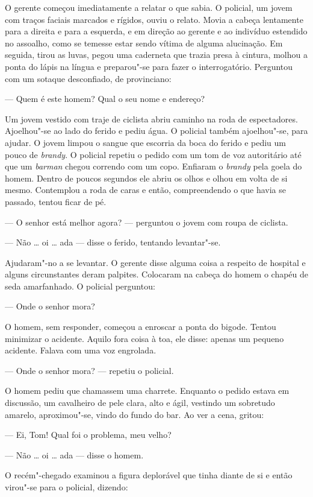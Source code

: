 O gerente começou imediatamente a relatar o que sabia.  O policial, um jovem
com traços faciais marcados e rígidos, ouviu o relato.  Movia a cabeça
lentamente para a direita e para a esquerda, e em direção ao gerente e ao
indivíduo estendido no assoalho, como se temesse estar sendo vítima de alguma
alucinação.  Em seguida, tirou as luvas, pegou uma caderneta que trazia presa à
cintura, molhou a ponta do lápis na língua e preparou"-se para fazer o
interrogatório.  Perguntou com um sotaque desconfiado, de provinciano:

--- Quem é este homem?  Qual o seu nome e endereço?

Um jovem vestido com traje de ciclista abriu caminho na roda de espectadores.
Ajoelhou"-se ao lado do ferido e pediu água.  O policial também ajoelhou"-se,
para ajudar.  O jovem limpou o sangue que escorria da boca do ferido e pediu um
pouco de \textit{brandy}.  O policial repetiu o pedido com um tom de voz
autoritário até que um \textit{barman} chegou correndo com um copo.  Enfiaram o
\textit{brandy} pela goela do homem.  Dentro de poucos segundos ele abriu os
olhos e olhou em volta de si mesmo.  Contemplou a roda de caras e então,
compreendendo o que havia se passado, tentou ficar de pé.

--- O senhor está melhor agora? --- perguntou o jovem com roupa de ciclista.

--- Não \ldots{} oi \ldots{} ada --- disse o ferido, tentando levantar"-se.

Ajudaram"-no a se levantar.  O gerente disse alguma coisa a respeito de hospital
e alguns circunstantes deram palpites.  Colocaram na cabeça do homem o chapéu
de seda amarfanhado.  O policial perguntou:

--- Onde o senhor mora?

O homem, sem responder, começou a enroscar a ponta do bigode.  Tentou minimizar
o acidente.  Aquilo fora coisa à toa, ele disse: apenas um pequeno acidente.
Falava com uma voz engrolada.

--- Onde o senhor mora? --- repetiu o policial.

O homem pediu que chamassem uma charrete.  Enquanto o pedido estava em
discussão, um cavalheiro de pele clara, alto e ágil, vestindo um sobretudo
amarelo, aproximou"-se, vindo do fundo do bar.  Ao ver a cena, gritou:

--- Ei, Tom!  Qual foi o problema, meu velho?

--- Não \ldots{} oi \ldots{} ada --- disse o homem.

O recém"-chegado examinou a figura deplorável que tinha diante de si e então
virou"-se para o policial, dizendo:

